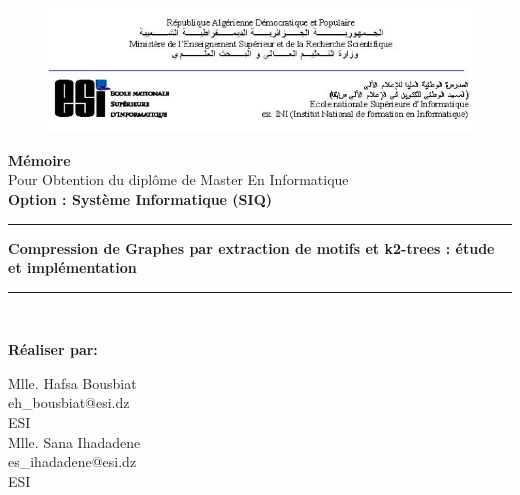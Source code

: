 \begin{titlepage}





	\begin{figure}[t]
		\includegraphics[scale=0.75]{./ressources/image/ESI.png}\\[0.6in]
	\end{figure}
	
	
	
	\begin{center}
	
		\LARGE \textbf{ Mémoire}\\
		\Large{
			Pour Obtention du diplôme de Master En Informatique\\
			\textbf{Option : Système Informatique (SIQ)}
		}\\
		\huge {
		\rule{\linewidth}{.5pt}
			\textbf{
				Compression de Graphes par extraction de motifs et k2-trees : étude et implémentation
			} 
			\rule{\linewidth}{.5pt}
		}\\[0.4in]
		\Large
	
	\textbf{Réaliser par:}\\
	\begin{multicols}{2}
			\Large 	Mlle. Hafsa Bousbiat\\
			\large eh\_bousbiat@esi.dz\\
			ESI\\
		\columnbreak
 			\Large Mlle. Sana Ihadadene\\
			\large es\_ihadadene@esi.dz\\
			ESI \\
		

\end{multicols}
\end{center}
\end{titlepage}
